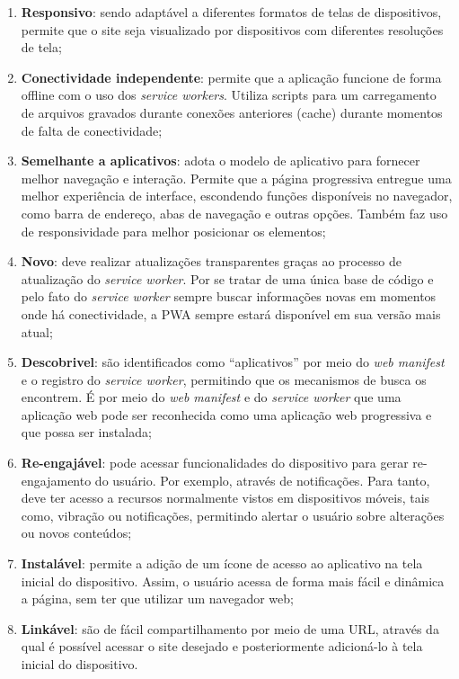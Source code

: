 \documentclass[12pt]{article}
\begin{document}
\begin{enumerate}
    \item \textbf{Responsivo}: sendo adaptável a diferentes formatos de telas de dispositivos, permite que o site seja visualizado por dispositivos com diferentes resoluções de tela;
    \item \textbf{Conectividade independente}: permite que a aplicação funcione de forma offline com o uso dos \textit{service workers}. Utiliza scripts para um carregamento de arquivos gravados durante conexões anteriores (cache) durante momentos de falta de conectividade;
    \item \textbf{Semelhante a aplicativos}: adota o modelo de aplicativo para fornecer melhor navegação e interação. Permite que a página progressiva entregue uma melhor experiência de interface, escondendo funções disponíveis no navegador, como barra de endereço, abas de navegação e outras opções. Também faz uso de responsividade para melhor posicionar os elementos;
    \item \textbf{Novo}: deve realizar atualizações transparentes graças ao processo de atualização do \textit{service worker}. Por se tratar de uma única base de código e pelo fato do \textit{service worker} sempre buscar informações novas em momentos onde há conectividade, a PWA sempre estará disponível em sua versão mais atual;
    \item \textbf{Descobrivel}: são identificados como “aplicativos” por meio do \textit{web manifest} e o registro do \textit{service worker}, permitindo que os mecanismos de busca os encontrem. É por meio do \textit{web manifest} e do \textit{service worker} que uma aplicação web pode ser reconhecida como uma aplicação web progressiva e que possa ser instalada;
    \item \textbf{Re-engajável}: pode acessar funcionalidades do dispositivo para gerar re-engajamento do usuário. Por exemplo, através de notificações. Para tanto, deve ter acesso a recursos normalmente vistos em dispositivos móveis, tais como, vibração ou notificações, permitindo alertar o usuário sobre alterações ou novos conteúdos;
    \item \textbf{Instalável}: permite a adição de um ícone de acesso ao aplicativo na tela inicial do dispositivo.  Assim, o usuário acessa de forma mais fácil e dinâmica a página, sem ter que utilizar um navegador web;
    \item \textbf{Linkável}: são de fácil compartilhamento por meio de uma URL, através da qual é possível acessar o site desejado e posteriormente adicioná-lo à tela inicial do dispositivo.
\end{enumerate}
\end{document}
